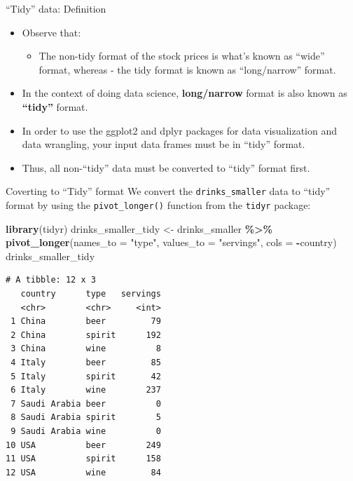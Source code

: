 \documentclass[
  ignorenonframetext,
]{beamer}
\newenvironment{Shaded}{\begin{snugshade}}{\end{snugshade}}
\newcommand{\AttributeTok}[1]{\textcolor[rgb]{0.13,0.29,0.53}{#1}}
\newcommand{\FunctionTok}[1]{\textcolor[rgb]{0.13,0.29,0.53}{\textbf{#1}}}
\newcommand{\NormalTok}[1]{#1}
\newcommand{\OtherTok}[1]{\textcolor[rgb]{0.56,0.35,0.01}{#1}}
\newcommand{\SpecialCharTok}[1]{\textcolor[rgb]{0.81,0.36,0.00}{\textbf{#1}}}
\newcommand{\StringTok}[1]{\textcolor[rgb]{0.31,0.60,0.02}{#1}}
\providecommand{\tightlist}{%
  \setlength{\itemsep}{0pt}\setlength{\parskip}{0pt}}
\begin{document}
\begin{frame}{``Tidy'' data: Definition}
\protect\hypertarget{tidy-data-definition-2}{}
\begin{itemize}
\item
  Observe that:

  \begin{itemize}
  \tightlist
  \item
    The non-tidy format of the stock prices is what's known as ``wide''
    format, whereas - the tidy format is known as ``long/narrow''
    format.
  \end{itemize}
\item
  In the context of doing data science, \textbf{long/narrow} format is
  also known as \textbf{``tidy''} format.
\item
  In order to use the ggplot2 and dplyr packages for data visualization
  and data wrangling, your input data frames must be in ``tidy'' format.
\item
  Thus, all non-``tidy'' data must be converted to ``tidy'' format
  first.
\end{itemize}
\end{frame}

\begin{frame}[fragile]{Coverting to ``Tidy'' format}
\protect\hypertarget{coverting-to-tidy-format}{}
We convert the \texttt{drinks\_smaller} data to ``tidy'' format by using
the \texttt{pivot\_longer()} function from the \texttt{tidyr} package:

\tiny

\begin{Shaded}
\begin{Highlighting}[]
\FunctionTok{library}\NormalTok{(tidyr)}
\NormalTok{drinks\_smaller\_tidy }\OtherTok{\textless{}{-}}\NormalTok{ drinks\_smaller }\SpecialCharTok{\%\textgreater{}\%} 
  \FunctionTok{pivot\_longer}\NormalTok{(}\AttributeTok{names\_to =} \StringTok{"type"}\NormalTok{, }
               \AttributeTok{values\_to =} \StringTok{"servings"}\NormalTok{, }
               \AttributeTok{cols =} \SpecialCharTok{{-}}\NormalTok{country)}
\NormalTok{drinks\_smaller\_tidy}
\end{Highlighting}
\end{Shaded}

\begin{verbatim}
# A tibble: 12 x 3
   country      type   servings
   <chr>        <chr>     <int>
 1 China        beer         79
 2 China        spirit      192
 3 China        wine          8
 4 Italy        beer         85
 5 Italy        spirit       42
 6 Italy        wine        237
 7 Saudi Arabia beer          0
 8 Saudi Arabia spirit        5
 9 Saudi Arabia wine          0
10 USA          beer        249
11 USA          spirit      158
12 USA          wine         84
\end{verbatim}

\normalsize
\end{frame}
\end{document}
